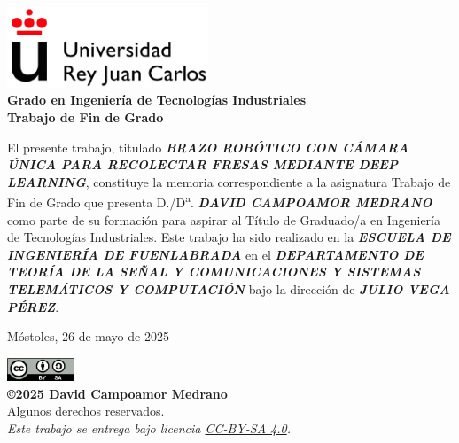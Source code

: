 

\thispagestyle{empty}
\begin{center}
    \includegraphics[width=0.45\textwidth]{figs/logo_urjc.jpg}\\[1cm]

    {\large{\textbf{Grado en Ingeniería de Tecnologías Industriales}}}\\[1cm]
    {\large{\textbf{Trabajo de Fin de Grado}}}\\[1cm]
\end{center}


El presente trabajo, titulado \textit{\textbf{BRAZO ROBÓTICO CON CÁMARA ÚNICA PARA RECOLECTAR FRESAS MEDIANTE DEEP LEARNING}}, constituye la memoria correspondiente a la asignatura Trabajo de Fin de Grado que presenta D./D\textsuperscript{a}. \textit{\textbf{DAVID CAMPOAMOR MEDRANO}} como parte de su formación para aspirar al Título de Graduado/a en Ingeniería de Tecnologías Industriales. Este trabajo ha sido realizado en la \textit{\textbf{ESCUELA DE INGENIERÍA DE FUENLABRADA}} en el \textit{\textbf{DEPARTAMENTO DE TEORÍA DE LA SEÑAL Y COMUNICACIONES Y SISTEMAS TELEMÁTICOS Y COMPUTACIÓN}} bajo la dirección de \textit{\textbf{JULIO VEGA PÉREZ}}.\\[3cm]

\begin{flushright}
Móstoles, 26 de mayo de 2025
\end{flushright}

\vspace{2cm}

\begin{flushright}
{\small
\includegraphics[width=0.15\textwidth]{figs/by-sa.png}\\
\textbf{\copyright 2025 David Campoamor Medrano}\\
Algunos derechos reservados.\\
\emph{
Este trabajo se entrega bajo licencia \href{https://creativecommons.org/licenses/by-sa/4.0/}{CC-BY-SA 4.0}.\\
}}
\end{flushright}


